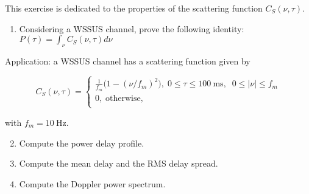 \documentclass [a4paper, 11pt] {article}
\begin{document}
    \pagebreak
   \begin{exercise}{2}
       This exercise is dedicated to the properties of the scattering function $C_S(\nu, \tau)$.

        \begin{enumerate}
            \item Considering a WSSUS channel, prove the following identity: $P(\tau) = \int_{\nu} C_S(\nu, \tau) d\nu$
        \end{enumerate}

        Application: a WSSUS channel has a scattering function given by

        \begin{equation}
             C_S(\nu, \tau) =\left\{
                        \begin{array}{ll}
                          \frac{1}{f_m}\big(1-(\nu/f_m)^2\big), \; 0 \leq \tau \leq \SI{100}{\milli\second}, \; \;  0 \leq |\nu| \leq f_m\\
                          0, \; \text{otherwise}, \\
                        \end{array}
                      \right.
        \end{equation}


        with $f_m = \SI{10}{\hertz}$.

        \begin{enumerate}
            \setcounter{enumi}{1}
            \item Compute the power delay profile.
            \item Compute the mean delay and the RMS delay spread.
            \item Compute the Doppler power spectrum.
        \end{enumerate}
   \end{exercise}
\end{document}
